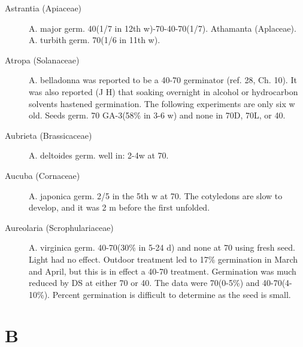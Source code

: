 \begin{description}
\item[Astrantia (Apiaceae)] A. major germ. 40(1/7 in 12th w)-70-40-70(1/7).
Athamanta (Aplaceae). A. turbith germ. 70(1/6 in 11th w).
\item[Atropa (Solanaceae)] A. belladonna was reported to be a 40-70 germinator
(ref. 28, Ch. 10). It was also reported (J H) that soaking overnight in alcohol or
hydrocarbon solvents hastened germination. The following experiments are only six w
old. Seeds germ. 70 GA-3(58\% in 3-6 w) and none in 70D, 70L, or 40.
\item[Aubrieta (Brassicaceae)] A. deltoides germ. well in: 2-4w at 70.
\item[Aucuba (Cornaceae)] A. japonica germ. 2/5 in the 5th w at 70. The
cotyledons are slow to develop, and it was 2 m before the first unfolded.

\item[Aureolaria (Scrophulariaceae)] A. virginica germ. 40-70(30\% in 5-24 d)
and none at 70 using fresh seed. Light had no effect. Outdoor treatment led to 17\%
germination in March and April, but this is in effect a 40-70 treatment. Germination
was much reduced by DS at either 70 or 40. The data were 70(0-5\%) and 40-70(4-
10\%). Percent germination is difficult to determine as the seed is small.

\end{description}
\section{B}


